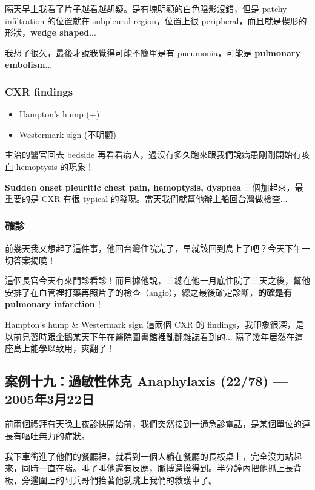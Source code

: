\documentclass[12pt,a4paper]{article}
\newenvironment{myquote}{%
    \begin{tcolorbox}[
        colback=quote_bg,
        colframe=emergency_gray,
        boxrule=0pt,
        leftrule=3pt,
        arc=0pt,
        left=10pt,
        right=10pt,
        top=8pt,
        bottom=8pt
    ]
    \itshape
}{%
    \end{tcolorbox}
}
\begin{document}
隔天早上我看了片子越看越胡疑。是有塊明顯的白色陰影沒錯，但是 patchy infiltration 的位置就在 subpleural region，位置上很 peripheral，而且就是楔形的形狀，\textbf{wedge shaped}...

我想了很久，最後才說我覺得可能不簡單是有 pneumonia，可能是 \textbf{pulmonary embolism}...

\subsubsection{CXR findings}

\begin{itemize}
    \item Hampton's hump (+)
    \item Westermark sign (不明顯)
\end{itemize}

主治的醫官回去 bedside 再看看病人，過沒有多久跑來跟我們說病患剛剛開始有咳血 hemoptysis 的現象！

\textbf{Sudden onset pleuritic chest pain, hemoptysis, dyspnea} 三個加起來，最重要的是 CXR 有很 typical 的發現。當天我們就幫他辦上船回台灣做檢查...

\subsubsection{確診}

前幾天我又想起了這件事，他回台灣住院完了，早就該回到島上了吧？今天下午一切答案揭曉！

這個長官今天有來門診看診！而且據他說，三總在他一月底住院了三天之後，幫他安排了在血管裡打藥再照片子的檢查（angio），總之最後確定診斷，\textbf{的確是有 pulmonary infarction}！

\begin{myquote}
Hampton's hump \& Westermark sign 這兩個 CXR 的 findings，我印象很深，是以前見習時跟企鵝某天下午在醫院圖書館裡亂翻雜誌看到的... 隔了幾年居然在這座島上能學以致用，爽翻了！
\end{myquote}

\subsection{案例十九：過敏性休克 Anaphylaxis (22/78) — 2005年3月22日}

前兩個禮拜有天晚上夜診快開始前，我們突然接到一通急診電話，是某個單位的連長有嘔吐無力的症狀。

我下車衝進了他們的餐廳裡，就看到一個人躺在餐廳的長板桌上，完全沒力站起來，同時一直在喘。叫了叫他還有反應，脈搏還摸得到。半分鐘內把他抓上長背板，旁邊圍上的阿兵哥們抬著他就跳上我們的救護車了。
\end{document}
